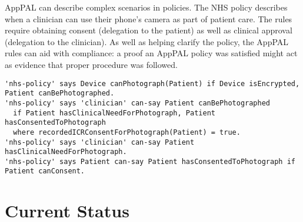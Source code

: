 \documentclass{easychair}
\newcommand{\dotdotdot}[1]{$[\cdots]$}
\begin{document}
AppPAL can describe complex scenarios in policies.
The NHS policy describes when a clinician can use their phone's camera as part of patient care.
The rules require obtaining consent (delegation to the patient) as well as clinical approval (delegation to the clinician). 
As well as helping clarify the policy, the AppPAL rules can aid with compliance:
    a proof an AppPAL policy was satisfied might act as evidence that proper procedure was followed.
\begin{lstlisting}[title={\footnotesize\textbf{NHS}:~\itshape ``%
Some mobile devices have the ability to take photographs / videos. 
This function should not be used for photographs / videos of an individual’s care and treatment unless the device has encryption enabled and it is clinically appropriate to do so.
If the photography / video facility is used as part of the recording of an individual’s care and treatment, the device user must ensure that the consent of the individual has been collected prior to taking any photograph / video. 
\dotdotdot{The individual needs to fully understand why the photograph / video is being taken and the member of staff plans to do with it, in particular if it will be shared. }
A record of the consent must be entered into the individual’s care record. 
''}]
'nhs-policy' says Device canPhotograph(Patient) if Device isEncrypted, Patient canBePhotographed.
'nhs-policy' says 'clinician' can-say Patient canBePhotographed
  if Patient hasClinicalNeedForPhotograph, Patient hasConsentedToPhotograph
  where recordedICRConsentForPhotograph(Patient) = true.
'nhs-policy' says 'clinician' can-say Patient hasClinicalNeedForPhotograph.
'nhs-policy' says Patient can-say Patient hasConsentedToPhotograph if Patient canConsent.
\end{lstlisting}

\section{Current Status}
\end{document}
